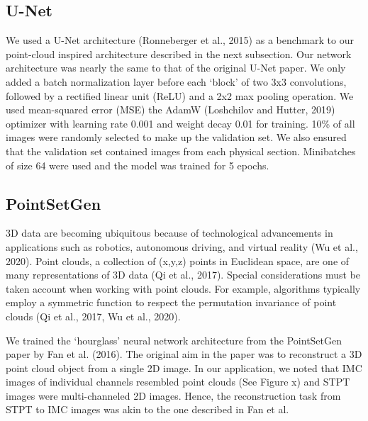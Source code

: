 \documentclass[10pt,twocolumn,letterpaper]{article}
\begin{document}
\subsection{U-Net}

We used a U-Net architecture (Ronneberger et al., 2015) as a benchmark to our point-cloud inspired architecture described in the next subsection. Our network architecture was nearly the same to that of the original U-Net paper. We only added a batch normalization layer before each ‘block’ of two 3x3 convolutions, followed by a rectified linear unit (ReLU) and a 2x2 max pooling operation. We used mean-squared error (MSE) the AdamW (Loshchilov and Hutter, 2019) optimizer with learning rate 0.001 and weight decay 0.01 for training. 10\% of all images were randomly selected to make up the validation set. We also ensured that the validation set contained images from each physical section. Minibatches of size 64 were used and the model was trained for 5 epochs.


\subsection{PointSetGen}

3D data are becoming ubiquitous because of technological advancements in applications such as robotics, autonomous driving, and virtual reality (Wu et al., 2020). Point clouds, a collection of (x,y,z) points in Euclidean space, are one of many representations of 3D data (Qi et al., 2017). Special considerations must be taken account when working with point clouds. For example, algorithms typically employ a symmetric function to respect the permutation invariance of point clouds (Qi et al., 2017, Wu et al., 2020). 

We trained the ‘hourglass’ neural network architecture from the PointSetGen paper by Fan et al. (2016). The original aim in the paper was to reconstruct a 3D point cloud object from a single 2D image. In our application, we noted that IMC images of individual channels resembled point clouds (See Figure x) and STPT images were multi-channeled 2D images. Hence, the reconstruction task from STPT to IMC images was akin to the one described in Fan et al.
 
\end{document}
